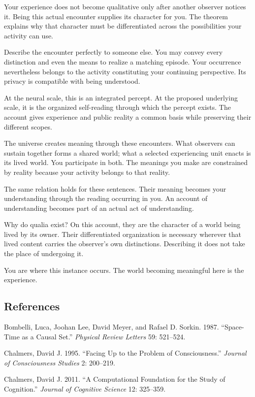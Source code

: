 \documentclass[
  11pt,
]{article}
\begin{document}
Your experience does not become qualitative only after another observer
notices it. Being this actual encounter supplies its character for you.
The theorem explains why that character must be differentiated across
the possibilities your activity can use.

Describe the encounter perfectly to someone else. You may convey every
distinction and even the means to realize a matching episode. Your
occurrence nevertheless belongs to the activity constituting your
continuing perspective. Its privacy is compatible with being understood.

At the neural scale, this is an integrated percept. At the proposed
underlying scale, it is the organized self-reading through which the
percept exists. The account gives experience and public reality a common
basis while preserving their different scopes.

The universe creates meaning through these encounters. What observers
can sustain together forms a shared world; what a selected experiencing
unit enacts is its lived world. You participate in both. The meanings
you make are constrained by reality because your activity belongs to
that reality.

The same relation holds for these sentences. Their meaning becomes your
understanding through the reading occurring in you. An account of
understanding becomes part of an actual act of understanding.

Why do qualia exist? On this account, they are the character of a world
being lived by its owner. Their differentiated organization is necessary
wherever that lived content carries the observer's own distinctions.
Describing it does not take the place of undergoing it.

You are where this instance occurs. The world becoming meaningful here
is the experience.

\subsection{References}\label{references}

Bombelli, Luca, Joohan Lee, David Meyer, and Rafael D. Sorkin. 1987.
``Space-Time as a Causal Set.'' \emph{Physical Review Letters} 59:
521--524.

Chalmers, David J. 1995. ``Facing Up to the Problem of Consciousness.''
\emph{Journal of Consciousness Studies} 2: 200--219.

Chalmers, David J. 2011. ``A Computational Foundation for the Study of
Cognition.'' \emph{Journal of Cognitive Science} 12: 325--359.
\end{document}
